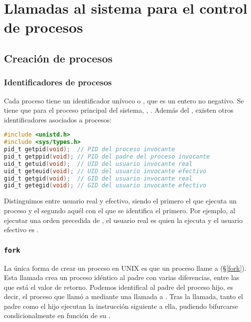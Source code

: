 \section{Llamadas al sistema para el control de procesos}

\subsection{Creación de procesos}

\subsubsection{Identificadores de procesos}

Cada proceso tiene un identificador unívoco o , que es un entero no negativo.
Se tiene que para el proceso principal del sistema, , .
Además del , existen otros identificadores asociados a procesos:

\begin{lstlisting}[language=C]
#include <unistd.h>
#include <sys/types.h>
pid_t getpid(void);  // PID del proceso invocante
pid_t getppid(void); // PID del padre del proceso invocante
uid_t getuid(void);  // UID del usuario invocante real
uid_t geteuid(void); // UID del usuario invocante efectivo
gid_t getgid(void);  // GID del usuario invocante real
gid_t getegid(void); // GID del usuario invocante efectivo
\end{lstlisting}

Distinguimos entre usuario real y efectivo, siendo el primero el que ejecuta un proceso y el segundo aquél con el que se identifica el primero.
Por ejemplo, al ejecutar una orden precedida de , el usuario real es quien la ejecuta y el usuario efectivo es .

\subsubsection{\texttt{fork}}

La única forma de crear un proceso en UNIX es que un proceso llame a  (\S\ref{fork}).
Esta llamada crea un proceso idéntico al padre con varias diferencias, entre las que está el valor de retorno.
Podemos identifical al padre del proceso hijo, es decir, el proceso que llamó a  mediante una llamada a .
Tras la llamada, tanto el padre como el hijo ejecutan la instrucción siguiente a ella, pudiendo bifurcarse condicionalmente en función de su .


